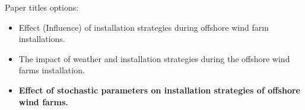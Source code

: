 Paper titles options:
\begin{itemize}
\item Effect (Influence) of installation strategies during offshore wind farm installations.
\item The impact of weather and installation strategies during the offshore wind farms installation.
\item \textbf{Effect of stochastic parameters on installation strategies of offshore wind farms.}
\end{itemize}